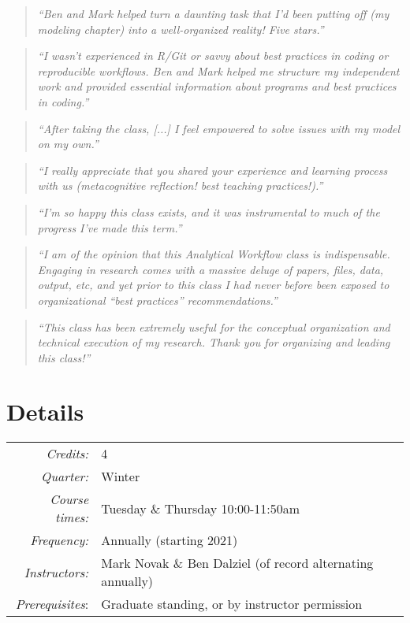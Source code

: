 \documentclass[10pt]{article}
\begin{document}
\begin{quote}
\emph{``Ben and Mark helped turn a daunting task that I'd been putting off (my modeling chapter) into a well-organized reality! Five stars.''}
\end{quote}
\begin{quote}
	\emph{``I wasn't experienced in R/Git or savvy about best practices in coding or reproducible workflows. Ben and Mark helped me structure my independent work and provided essential information about programs and best practices in coding.''}
\end{quote}
\begin{quote}
	\emph{``After taking the class, [...] I feel empowered to solve issues with my model on my own.''}
\end{quote}
\begin{quote}
	\emph{``I really appreciate that you shared your experience and learning process with us (metacognitive reflection! best teaching practices!).''}
\end{quote}
\begin{quote}
	\emph{``I'm so happy this class exists, and it was instrumental to much of the progress I've made this term.''}
\end{quote}
\begin{quote}
	\emph{``I am of the opinion that this Analytical Workflow class is indispensable. Engaging in research comes with a massive deluge of papers, files, data, output, etc, and yet prior to this class I had never before been exposed to organizational ``best practices'' recommendations.''}
\end{quote}
\begin{quote}
	\emph{``This class has been extremely useful for the conceptual organization and technical execution of my research. Thank you for organizing and leading this class!''}
\end{quote}


\section*{Details}
\begin{tabular}{rl}
	\emph{Credits:}	&  4\\ 
	\emph{Quarter:} & Winter\\
	\emph{Course times:} &  Tuesday \& Thursday 10:00-11:50am\\
	\emph{Frequency:} & Annually (starting 2021)\\
	\emph{Instructors:} & Mark Novak \& Ben Dalziel (of record alternating annually)\\
	\emph{Prerequisites}: & Graduate standing, or by instructor permission
\end{tabular} 
\end{document}
